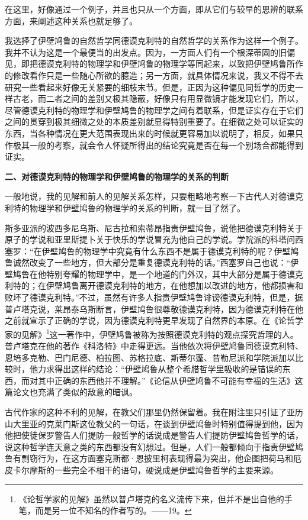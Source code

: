 \documentclass[a4paper,twoside,12pt,AutoFakeBold]{ctexart}
\begin{document}
在这里，好像通过一个例子，并且也只从一个方面，即从它们与较早的思辨的联系方面，来阐述这种关系也就足够了。

我选择了伊壁鸠鲁的自然哲学同德谟克利特的自然哲学的关系作为这样一个例子。我并不认为这是一个最便当的出发点。因为，一方面人们有一个根深蒂固的旧偏见，即把德谟克利特的物理学和伊壁鸠鲁的物理学等同起来，以致把伊壁鸠鲁所作的修改看作只是一些随心所欲的臆造；另一方面，就具体情况来说，我又不得不去研究一些看起来好像无关紧要的细枝末节。但是，正因为这种偏见同哲学的历史一样古老，而二者之间的差别又极其隐蔽，好像只有用显微镜才能发现它们，所以，尽管德谟克利特的物理学和伊壁鸠鲁的物理学之间有着联系，但是证实存在于它们之间的贯穿到极其细微之处的本质差别就显得特别重要了。在细微之处可以证实的东西，当各种情况在更大范围表现出来的时候就更容易加以说明了，相反，如果只作极其一般的考察，就会令人怀疑所得出的结论究竟是否在每一个别场合都能得到证实。

\textbf{二、对德谟克利特的物理学和伊壁鸠鲁的物理学的关系的判断}

一般地说，我的见解和前人的见解关系怎样，只要粗略地考察一下古代人对德谟克利特的物理学和伊壁鸠鲁的物理学的关系的判断，就一目了然了。

斯多亚派的波西多尼乌斯、尼古拉和索蒂昂指责伊壁鸠鲁，说他把德谟克利特关于原子的学说和亚里斯提卜关于快乐的学说冒充为他自己的学说。学院派的科塔问西塞罗：“在伊壁鸠鲁的物理学中究竟有什么东西不是属于德谟克利特的呢？伊壁鸠鲁诚然改变了一些地方，但大部分是重复德谟克利特的话。”西塞罗自己也说：“伊壁鸠鲁在他特别夸耀的物理学中，是一个地道的门外汉，其中大部分是属于德谟克利特的；在伊壁鸠鲁离开德谟克利特的地方，在他想加以改进的地方，他都损害和败坏了德谟克利特。”不过，虽然有许多人指责伊壁鸠鲁诽谤德谟克利特，但是，据普卢塔克说，莱昂泰乌斯断言，伊壁鸠鲁很尊敬德谟克利特，因为德谟克利特在他之前就宣示了正确的学说，因为德谟克利特更早发现了自然界的本原。在《论哲学家的见解》\footnote{《论哲学家的见解》虽然以普卢塔克的名义流传下来，但并不是出自他的手笔，而是另一位不知名的作者写的。——19。}这一著作中，伊壁鸠鲁被称为按照德谟克利特的观点探究哲理的人。普卢塔克在他的著作《科洛特》中走得更远。当他依次将伊壁鸠鲁同德谟克利特、恩培多克勒、巴门尼德、柏拉图、苏格拉底、斯蒂尔蓬、昔勒尼派和学院派加以比较时，他力求得出这样的结论：“伊壁鸠鲁从整个希腊哲学里吸收的是错误的东西，而对其中正确的东西他并不理解。”《论信从伊壁鸠鲁不可能有幸福的生活》这篇论文也充满了类似的敌意的暗讽。

古代作家的这种不利的见解，在教父们那里仍然保留着。我在附注里只引证了亚历山大里亚的克莱门斯这位教父的一句话，在谈到伊壁鸠鲁时特别值得提到他，因为他把使徒保罗警告人们提防一般哲学的话说成是警告人们提防伊壁鸠鲁哲学的话，说这种哲学连天意之类的东西都没有幻想过。但是，人们一般都倾向于指责伊壁鸠鲁有剽窃行为，在这方面塞克斯都·恩披里柯表现得最为突出，他企图把荷马和厄皮卡尔摩斯的一些完全不相干的语句，硬说成是伊壁鸠鲁哲学的主要来源。
\end{document}
